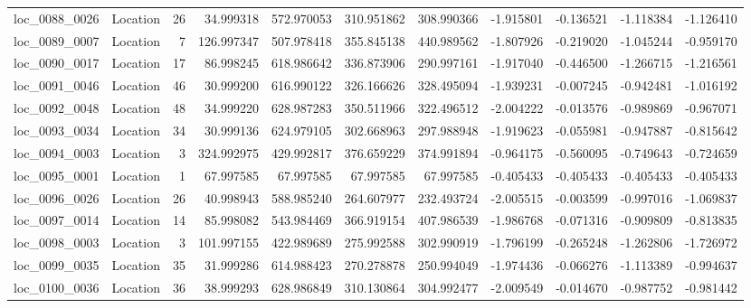 \begin{tabular}{llrrrrrrrrr}
loc_0088_0026 &        Location &              26 &  34.999318 & 572.970053 &  310.951862 &    308.990366 &  -1.915801 &  -0.136521 &   -1.118384 &     -1.126410 \\
loc_0089_0007 &        Location &               7 & 126.997347 & 507.978418 &  355.845138 &    440.989562 &  -1.807926 &  -0.219020 &   -1.045244 &     -0.959170 \\
loc_0090_0017 &        Location &              17 &  86.998245 & 618.986642 &  336.873906 &    290.997161 &  -1.917040 &  -0.446500 &   -1.266715 &     -1.216561 \\
loc_0091_0046 &        Location &              46 &  30.999200 & 616.990122 &  326.166626 &    328.495094 &  -1.939231 &  -0.007245 &   -0.942481 &     -1.016192 \\
loc_0092_0048 &        Location &              48 &  34.999220 & 628.987283 &  350.511966 &    322.496512 &  -2.004222 &  -0.013576 &   -0.989869 &     -0.967071 \\
loc_0093_0034 &        Location &              34 &  30.999136 & 624.979105 &  302.668963 &    297.988948 &  -1.919623 &  -0.055981 &   -0.947887 &     -0.815642 \\
loc_0094_0003 &        Location &               3 & 324.992975 & 429.992817 &  376.659229 &    374.991894 &  -0.964175 &  -0.560095 &   -0.749643 &     -0.724659 \\
loc_0095_0001 &        Location &               1 &  67.997585 &  67.997585 &   67.997585 &     67.997585 &  -0.405433 &  -0.405433 &   -0.405433 &     -0.405433 \\
loc_0096_0026 &        Location &              26 &  40.998943 & 588.985240 &  264.607977 &    232.493724 &  -2.005515 &  -0.003599 &   -0.997016 &     -1.069837 \\
loc_0097_0014 &        Location &              14 &  85.998082 & 543.984469 &  366.919154 &    407.986539 &  -1.986768 &  -0.071316 &   -0.909809 &     -0.813835 \\
loc_0098_0003 &        Location &               3 & 101.997155 & 422.989689 &  275.992588 &    302.990919 &  -1.796199 &  -0.265248 &   -1.262806 &     -1.726972 \\
loc_0099_0035 &        Location &              35 &  31.999286 & 614.988423 &  270.278878 &    250.994049 &  -1.974436 &  -0.066276 &   -1.113389 &     -0.994637 \\
loc_0100_0036 &        Location &              36 &  38.999293 & 628.986849 &  310.130864 &    304.992477 &  -2.009549 &  -0.014670 &   -0.987752 &     -0.981442 \\

\end{tabular}
